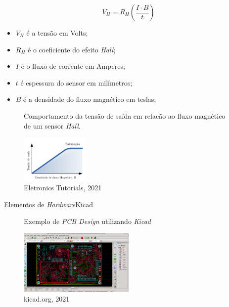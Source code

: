 \begin{frame}{}
    \begin{equation}
        V_H = R_H\left ( \frac{I\cdot B}{t} \right)
        \end{equation}
        
        \begin{itemize}
            
            \item $V_H$ é a tensão em Volts;
            \item $R_H$ é o coeficiente do efeito \textit{Hall};
            \item  $I$ é o fluxo de corrente em Amperes;
            \item $t$ é espessura do sensor em milímetros;
            \item $B$ é a densidade do fluxo magnético em teslas; \ \\
        \end{itemize}

        \begin{figure}[H]
            \centering
            \caption{Comportamento da tensão de saída em relacão ao fluxo magnético de um sensor \textit{Hall}.}
            \includegraphics[width=0.3\textwidth]{figuras/grafico_hall.jpg}
            \caption*{\tiny{Eletronics Tutorials, 2021}}
            \label{fig:efeito_hall}
        \end{figure} 

\end{frame}

\begin{frame}{Elementos de \textit{Hardware}}{Kicad}
    \begin{figure}[H]
        \centering
        \caption{Exemplo de \textit{PCB Design} utilizando \textit{Kicad}}
        \includegraphics[width=0.5\textwidth]{figuras/kicad_pcbnew.png}
        \caption*{\tiny{kicad.org, 2021}}
        \label{fig:kicad_pcbnew}
    \end{figure} 

\end{frame}


